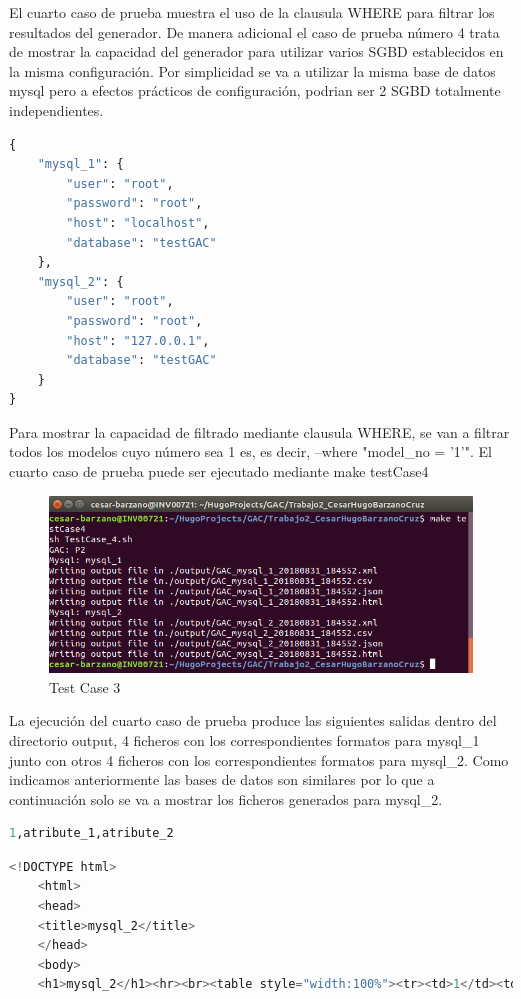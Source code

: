 \documentclass[a4paper,11pt]{book}
\begin{document}
El cuarto caso de prueba muestra el uso de la clausula WHERE para filtrar los resultados del generador. De manera adicional el caso de prueba número 4 trata de mostrar la capacidad del generador para utilizar varios SGBD establecidos en la misma configuración. Por simplicidad se va a utilizar la misma base de datos mysql pero a efectos prácticos de configuración, podrian ser 2 SGBD totalmente independientes. 

\begin{lstlisting}[language=python,caption={GAC\_GENERATOR\_CONFIG\_4.json }]
  {
	"mysql_1": {
		"user": "root",
		"password": "root",
		"host": "localhost",
		"database": "testGAC"
	},
	"mysql_2": {
		"user": "root",
		"password": "root",
		"host": "127.0.0.1",
		"database": "testGAC"
	}
}
\end{lstlisting}

Para mostrar la capacidad de filtrado mediante clausula WHERE, se van a filtrar todos los modelos cuyo número sea 1 es, es decir, --where "model\_no = '1'". El cuarto caso de prueba puede ser ejecutado mediante make testCase4

\begin{figure}[H]  
\centering 
\includegraphics[scale=0.35]{imagenes/TestCase4_1.png}
\caption{ Test Case 3 }  
\end{figure}

La ejecución del cuarto caso de prueba produce las siguientes salidas dentro del directorio output, 4 ficheros con los correspondientes formatos para mysql\_1 junto con otros 4 ficheros con los correspondientes formatos para mysql\_2. Como indicamos anteriormente las bases de datos son similares por lo que a continuación solo se va a mostrar los ficheros generados para mysql\_2. 


\begin{lstlisting}[language=python,caption={Formato CSV }]
1,atribute_1,atribute_2
\end{lstlisting}

\begin{lstlisting}[language=python,caption={Formato HTML }]
<!DOCTYPE html>
    <html>
    <head>
    <title>mysql_2</title>
    </head>
    <body>
    <h1>mysql_2</h1><hr><br><table style="width:100%"><tr><td>1</td><td>atribute_1</td><td>atribute_2</td></tr></table></body></html> 
\end{lstlisting}
\end{document}
